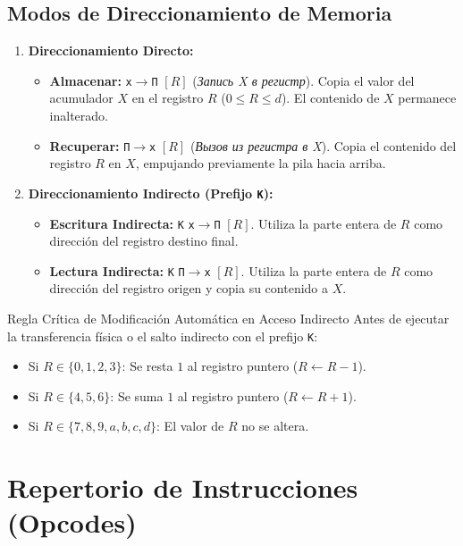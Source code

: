 \documentclass[11pt,a4paper]{article}
\begin{document}
\subsection{Modos de Direccionamiento de Memoria}
\begin{enumerate}
    \item \textbf{Direccionamiento Directo:}
    \begin{itemize}
        \item \textbf{Almacenar:} \texttt{x$\to$П} $[R]$ (\textit{Запись X в регистр}). Copia el valor del acumulador $X$ en el registro $R$ ($0 \le R \le d$). El contenido de $X$ permanece inalterado.
        \item \textbf{Recuperar:} \texttt{П$\to$x} $[R]$ (\textit{Вызов из регистра в X}). Copia el contenido del registro $R$ en $X$, empujando previamente la pila hacia arriba.
    \end{itemize}
    \item \textbf{Direccionamiento Indirecto (Prefijo \texttt{K}):}
    \begin{itemize}
        \item \textbf{Escritura Indirecta:} \texttt{K} \texttt{x$\to$П} $[R]$. Utiliza la parte entera de $R$ como dirección del registro destino final.
        \item \textbf{Lectura Indirecta:} \texttt{K} \texttt{П$\to$x} $[R]$. Utiliza la parte entera de $R$ como dirección del registro origen y copia su contenido a $X$.
    \end{itemize}
\end{enumerate}

\begin{techbox}{Regla Crítica de Modificación Automática en Acceso Indirecto}
Antes de ejecutar la transferencia física o el salto indirecto con el prefijo \texttt{K}:
\begin{itemize}
    \item Si $R \in \{0, 1, 2, 3\}$: Se resta $1$ al registro puntero ($R \leftarrow R - 1$).
    \item Si $R \in \{4, 5, 6\}$: Se suma $1$ al registro puntero ($R \leftarrow R + 1$).
    \item Si $R \in \{7, 8, 9, a, b, c, d\}$: El valor de $R$ no se altera.
\end{itemize}
\end{techbox}

\newpage

\section{Repertorio de Instrucciones (Opcodes)}
\end{document}
